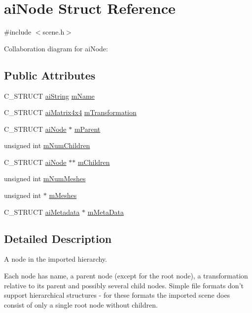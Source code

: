 \hypertarget{structai_node}{\section{ai\-Node Struct Reference}
\label{structai_node}
}


{\ttfamily \#include $<$scene.\-h$>$}



Collaboration diagram for ai\-Node\-:
\subsection*{Public Attributes}
\begin{DoxyCompactItemize}
\item 
C\-\_\-\-S\-T\-R\-U\-C\-T \hyperlink{structai_string}{ai\-String} \hyperlink{structai_node_afa528a7e43e15d92a920229b1ff094f6}{m\-Name}
\item 
C\-\_\-\-S\-T\-R\-U\-C\-T \hyperlink{structai_matrix4x4}{ai\-Matrix4x4} \hyperlink{structai_node_aadb69c766c7658bba9d2195af16d6831}{m\-Transformation}
\item 
C\-\_\-\-S\-T\-R\-U\-C\-T \hyperlink{structai_node}{ai\-Node} $\ast$ \hyperlink{structai_node_aa6896b42c78e784db85d822a4c8dd404}{m\-Parent}
\item 
unsigned int \hyperlink{structai_node_af5030494b156ec54632e6182a6e386ca}{m\-Num\-Children}
\item 
C\-\_\-\-S\-T\-R\-U\-C\-T \hyperlink{structai_node}{ai\-Node} $\ast$$\ast$ \hyperlink{structai_node_ac700679f0d4971f124e8444f68057291}{m\-Children}
\item 
unsigned int \hyperlink{structai_node_a7a411079096f86d1e96b6368d237d897}{m\-Num\-Meshes}
\item 
unsigned int $\ast$ \hyperlink{structai_node_acd1706d6508b31916c18e39b7085ca63}{m\-Meshes}
\item 
C\-\_\-\-S\-T\-R\-U\-C\-T \hyperlink{structai_metadata}{ai\-Metadata} $\ast$ \hyperlink{structai_node_a111b5a6cbc5dccde0cf2a17a6e5c3b67}{m\-Meta\-Data}
\end{DoxyCompactItemize}


\subsection{Detailed Description}
A node in the imported hierarchy.

Each node has name, a parent node (except for the root node), a transformation relative to its parent and possibly several child nodes. Simple file formats don't support hierarchical structures -\/ for these formats the imported scene does consist of only a single root node without children. 

